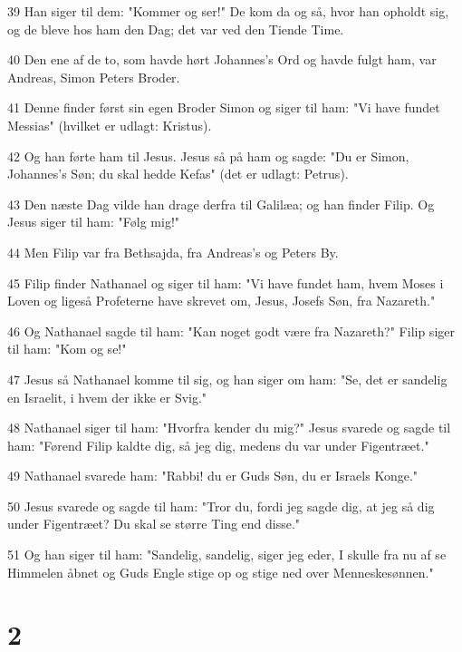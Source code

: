\par 39 Han siger til dem: "Kommer og ser!" De kom da og så, hvor han opholdt sig, og de bleve hos ham den Dag; det var ved den Tiende Time.
\par 40 Den ene af de to, som havde hørt Johannes's Ord og havde fulgt ham, var Andreas, Simon Peters Broder.
\par 41 Denne finder først sin egen Broder Simon og siger til ham: "Vi have fundet Messias" (hvilket er udlagt: Kristus).
\par 42 Og han førte ham til Jesus. Jesus så på ham og sagde: "Du er Simon, Johannes's Søn; du skal hedde Kefas" (det er udlagt: Petrus).
\par 43 Den næste Dag vilde han drage derfra til Galilæa; og han finder Filip. Og Jesus siger til ham: "Følg mig!"
\par 44 Men Filip var fra Bethsajda, fra Andreas's og Peters By.
\par 45 Filip finder Nathanael og siger til ham: "Vi have fundet ham, hvem Moses i Loven og ligeså Profeterne have skrevet om, Jesus, Josefs Søn, fra Nazareth."
\par 46 Og Nathanael sagde til ham: "Kan noget godt være fra Nazareth?" Filip siger til ham: "Kom og se!"
\par 47 Jesus så Nathanael komme til sig, og han siger om ham: "Se, det er sandelig en Israelit, i hvem der ikke er Svig."
\par 48 Nathanael siger til ham: "Hvorfra kender du mig?" Jesus svarede og sagde til ham: "Førend Filip kaldte dig, så jeg dig, medens du var under Figentræet."
\par 49 Nathanael svarede ham: "Rabbi! du er Guds Søn, du er Israels Konge."
\par 50 Jesus svarede og sagde til ham: "Tror du, fordi jeg sagde dig, at jeg så dig under Figentræet? Du skal se større Ting end disse."
\par 51 Og han siger til ham: "Sandelig, sandelig, siger jeg eder, I skulle fra nu af se Himmelen åbnet og Guds Engle stige op og stige ned over Menneskesønnen."

\chapter{2}

